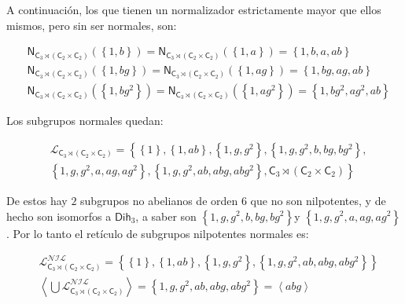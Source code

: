 \documentclass[12pt,a4paper,fleqn,spanish,final,openright]{extbook}
\theoremstyle{definition}
\theoremstyle{remark}
\begin{document}
A continuación, los que tienen un normalizador estrictamente mayor que ellos mismos, pero sin ser normales, son:

\begin{align*}
&\mathsf{N}_{{\mathsf{C}_{3}}\rtimes({\mathsf{C}_{2}}\times{\mathsf{C}_{2}})}
\left({\left\lbrace{1,b}\right\rbrace}\right) =
\mathsf{N}_{{\mathsf{C}_{3}}\rtimes({\mathsf{C}_{2}}\times{\mathsf{C}_{2}})}
\left({\left\lbrace{1,a}\right\rbrace}\right) = 
\left\lbrace{1,b,a,ab}\right\rbrace
\\
&\mathsf{N}_{{\mathsf{C}_{3}}\rtimes({\mathsf{C}_{2}}\times{\mathsf{C}_{2}})}
\left({\left\lbrace{1,bg}\right\rbrace}\right) = 
\mathsf{N}_{{\mathsf{C}_{3}}\rtimes({\mathsf{C}_{2}}\times{\mathsf{C}_{2}})}
\left({\left\lbrace{1,ag}\right\rbrace}\right) = 
{\left\lbrace{1,bg,ag,ab}\right\rbrace}
\\
&\mathsf{N}_{{\mathsf{C}_{3}}\rtimes({\mathsf{C}_{2}}\times{\mathsf{C}_{2}})}
\left({\left\lbrace{1,bg^2}\right\rbrace}\right) = 
\mathsf{N}_{{\mathsf{C}_{3}}\rtimes({\mathsf{C}_{2}}\times{\mathsf{C}_{2}})}
\left({\left\lbrace{1,ag^2}\right\rbrace}\right) = 
{\left\lbrace{1,bg^2,ag^2,ab}\right\rbrace}
\end{align*}

Los subgrupos normales quedan:

\begin{align*}
&{\mathcal{L}}_{{{\mathsf{C}}_{3}}\rtimes
{\left({
{{\mathsf{C}}_{2}}\times{{\mathsf{C}}_{2}}
}\right)}}=
{\left\lbrace\right.}
{\left\lbrace{1}\right\rbrace},
{\left\lbrace{1,ab}\right\rbrace},
{\left\lbrace{1,g,g^2}\right\rbrace},
{\left\lbrace{1,g,g^2,b,bg,bg^2}\right\rbrace},\\
&{\left\lbrace{1,g,g^2,a,ag,ag^2}\right\rbrace},
{\left\lbrace{1,g,g^2,ab,abg,abg^2}\right\rbrace},
{{\mathsf{C}}_{3}}
\rtimes
{\left({
{{\mathsf{C}}_{2}}\times{{\mathsf{C}}_{2}}
}\right)}
{\left.\right\rbrace}
\end{align*}

De estos hay $2$ subgrupos no abelianos de orden $6$ que no son nilpotentes, y de hecho son isomorfos a $\mathsf{Dih}_{3}$, a saber son ${\left\lbrace{1,g,g^2,b,bg,bg^2}\right\rbrace}$y ${\left\lbrace{1,g,g^2,a,ag,ag^2}\right\rbrace}$. Por lo tanto el retículo de subgrupos nilpotentes normales es:

\begin{align*}
&{\mathcal{L}}_{{{\mathsf{C}}_{3}}\rtimes
{\left({
{{\mathsf{C}}_{2}}\times{{\mathsf{C}}_{2}}
}\right)}}^{\mathcal{NIL}}=
\left\lbrace
{\left\lbrace{1}\right\rbrace},
{\left\lbrace{1,ab}\right\rbrace},
{\left\lbrace{1,g,g^2}\right\rbrace},
{\left\lbrace{1,g,g^2,ab,abg,abg^2}\right\rbrace}
\right\rbrace\\
&\left\langle{\bigcup{\mathcal{L}}_{{{\mathsf{C}}_{3}}\rtimes
{\left({
{{\mathsf{C}}_{2}}\times{{\mathsf{C}}_{2}}
}\right)}}^{\mathcal{NIL}}}\right\rangle = {\left\lbrace{1,g,g^2,ab,abg,abg^2}\right\rbrace} = \left\langle abg \right\rangle
\end{align*}
\end{document}
